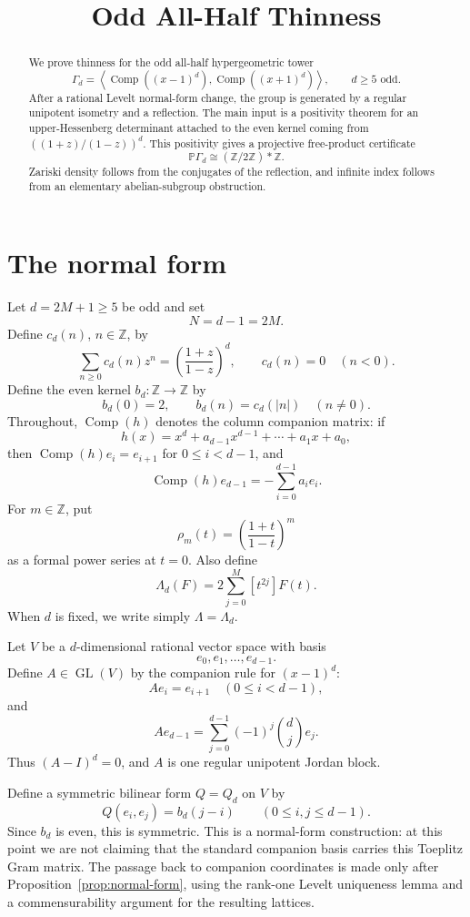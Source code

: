 \documentclass[a4paper,11pt]{amsart}
\title{Odd All-Half Thinness}
\date{}
\theoremstyle{remark}
\newcommand{\Z}{\mathbb Z}
\newcommand{\PP}{\mathbb P}
\DeclareMathOperator{\Comp}{Comp}
\DeclareMathOperator{\GL}{GL}
\numberwithin{equation}{section}
\begin{document}
\begin{abstract}
We prove thinness for the odd all-half hypergeometric tower
\[
\Gamma_d=\left\langle \Comp((x-1)^d),\Comp((x+1)^d)\right\rangle,
\qquad d\ge5\text{ odd}.
\]
After a rational Levelt normal-form change, the group is generated by a regular unipotent isometry and a reflection.  The main input is a positivity theorem for an upper-Hessenberg determinant attached to the even kernel coming from \(((1+z)/(1-z))^d\).  This positivity gives a projective free-product certificate
\[
\PP\Gamma_d\cong (\Z/2\Z)*\Z.
\]
Zariski density follows from the conjugates of the reflection, and infinite index follows from an elementary abelian-subgroup obstruction.
\end{abstract}

\maketitle

\section{The normal form}

Let \(d=2M+1\ge5\) be odd and set
\[
        N=d-1=2M.
\]
Define \(c_d(n)\), \(n\in\Z\), by
\[
        \sum_{n\ge0}c_d(n)z^n
        =
        \left(\frac{1+z}{1-z}\right)^d,
        \qquad
        c_d(n)=0\quad(n<0).
\]
Define the even kernel \(b_d:\Z\to\Z\) by
\[
        b_d(0)=2,
        \qquad
        b_d(n)=c_d(|n|)\quad(n\ne0).
\]
Throughout, \(\Comp(h)\) denotes the column companion matrix: if
\[
        h(x)=x^d+a_{d-1}x^{d-1}+\cdots+a_1x+a_0,
\]
then \(\Comp(h)e_i=e_{i+1}\) for \(0\le i<d-1\), and
\[
        \Comp(h)e_{d-1}=-\sum_{i=0}^{d-1}a_i e_i.
\]
For \(m\in\Z\), put
\[
        \rho_m(t)=\left(\frac{1+t}{1-t}\right)^m
\]
as a formal power series at \(t=0\).  Also define
\[
        \Lambda_d(F)=2\sum_{j=0}^{M}[t^{2j}]F(t).
\]
When \(d\) is fixed, we write simply \(\Lambda=\Lambda_d\).

Let \(V\) be a \(d\)-dimensional rational vector space with basis
\[
        e_0,e_1,\ldots,e_{d-1}.
\]
Define \(A\in\GL(V)\) by the companion rule for \((x-1)^d\):
\[
        Ae_i=e_{i+1}\quad(0\le i<d-1),
\]
and
\[
        Ae_{d-1}
        =
        \sum_{j=0}^{d-1}(-1)^j\binom dj e_j.
\]
Thus \((A-I)^d=0\), and \(A\) is one regular unipotent Jordan block.

Define a symmetric bilinear form \(Q=Q_d\) on \(V\) by
\[
        Q(e_i,e_j)=b_d(j-i)
        \qquad(0\le i,j\le d-1).
\]
Since \(b_d\) is even, this is symmetric.  This is a normal-form construction: at this point we are not claiming that the standard companion basis carries this Toeplitz Gram matrix.  The passage back to companion coordinates is made only after Proposition~\ref{prop:normal-form}, using the rank-one Levelt uniqueness lemma and a commensurability argument for the resulting lattices.
\end{document}
